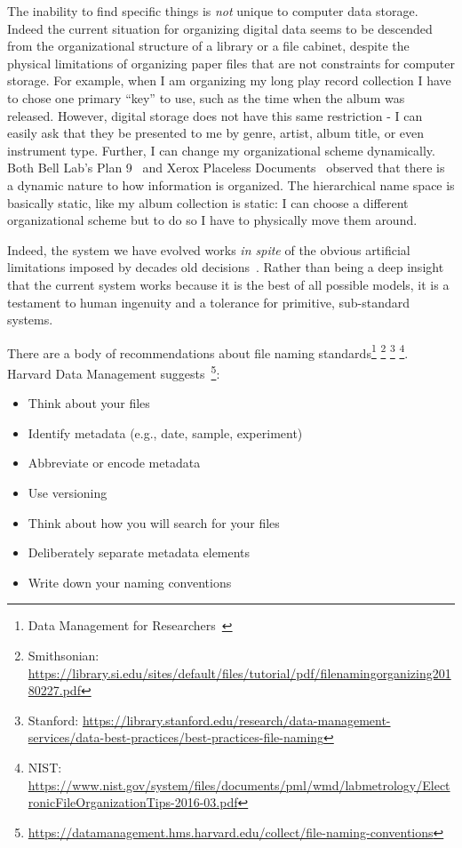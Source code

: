 The inability to find specific things is \textit{not} unique to computer data storage.
Indeed the current situation for organizing digital data seems to be descended
from the organizational structure of a library or a file cabinet, despite the
physical limitations of organizing paper files that are not constraints for
computer storage.  For example, when I am organizing my long play record
collection I have to chose one primary ``key'' to use, such as the time when the
album was released.  However, digital storage does not have this same
restriction - I can easily ask that they be presented to me by genre, artist,
album title, or even instrument type. Further, I can change my organizational
scheme dynamically.  Both Bell Lab's Plan 9~\cite{plan9} and Xerox Placeless
Documents~\cite{dourish1999getting}
observed that there is a dynamic nature to how information is organized.  The
hierarchical name space is basically static, like my album collection is static:
I can choose a different organizational scheme but to do so I have to physically
move them around.

Indeed, the system we have evolved works \emph{in spite} of the obvious
artificial limitations imposed by decades old decisions~\cite{dourish2003the}.  Rather than being
a deep insight that the current system works because it is the best of all
possible models, it is a testament to human ingenuity and a tolerance for
primitive, sub-standard systems.

There are a body of recommendations about file naming
standards\footnote{Data Management for
    Researchers~\cite{briney2015data}}
\footnote{Smithsonian: \url{https://library.si.edu/sites/default/files/tutorial/pdf/filenamingorganizing20180227.pdf}}
\footnote{Stanford: \url{https://library.stanford.edu/research/data-management-services/data-best-practices/best-practices-file-naming}}
\footnote{NIST: \url{https://www.nist.gov/system/files/documents/pml/wmd/labmetrology/ElectronicFileOrganizationTips-2016-03.pdf}}.
Harvard Data Management suggests~\footnote{\url{https://datamanagement.hms.harvard.edu/collect/file-naming-conventions}}:

\begin{itemize}
    \item Think about your files
    \item Identify metadata (e.g., date, sample, experiment)
    \item Abbreviate or encode metadata
    \item Use versioning
    \item Think about how you will search for your files
    \item Deliberately separate metadata elements
    \item Write down your naming conventions
\end{itemize}

